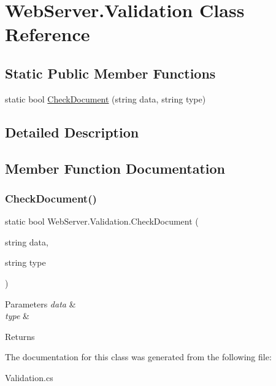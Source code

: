 \hypertarget{class_web_server_1_1_validation}{}\section{Web\+Server.\+Validation Class Reference}
\label{class_web_server_1_1_validation}


 


\subsection*{Static Public Member Functions}
\begin{DoxyCompactItemize}
\item 
static bool \hyperlink{class_web_server_1_1_validation_a8f96c06498e6bd9337aa638e45340d65}{Check\+Document} (string data, string type)
\end{DoxyCompactItemize}


\subsection{Detailed Description}




\subsection{Member Function Documentation}
\mbox{\label{class_web_server_1_1_validation_a8f96c06498e6bd9337aa638e45340d65}} 
\subsubsection{\texorpdfstring{Check\+Document()}{CheckDocument()}}
{\footnotesize\ttfamily static bool Web\+Server.\+Validation.\+Check\+Document (\begin{DoxyParamCaption}\item[{string}]{data,  }\item[{string}]{type }\end{DoxyParamCaption})\hspace{0.3cm}{\ttfamily [static]}}






\begin{DoxyParams}{Parameters}
{\em data} & \\
\hline
{\em type} & \\
\hline
\end{DoxyParams}
\begin{DoxyReturn}{Returns}

\end{DoxyReturn}


The documentation for this class was generated from the following file\+:\begin{DoxyCompactItemize}
\item 
Validation.\+cs\end{DoxyCompactItemize}
